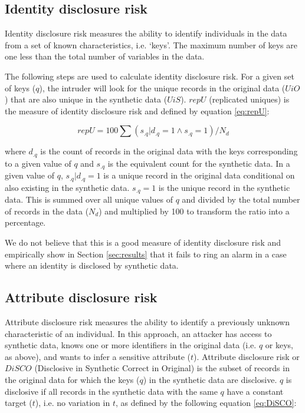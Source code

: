 \documentclass[a4paper,11pt]{style/uneceart}
\begin{document}
\subsection{Identity disclosure risk} 
Identity disclosure risk measures the ability to identify individuals in the data from a set of known characteristics, i.e. `keys'. The maximum number of keys are one less than the total number of variables in the data.  

The following steps are used to calculate identity disclosure risk.  For a given set of keys ($q$), the intruder will look for the unique records in the original data ($UiO$) that are also unique in the synthetic data ($UiS$).  $repU$ (replicated uniques) is the measure of identity disclosure risk and defined by equation \ref{eq:repU}:

\begin{equation}
repU = 100 \sum (s_{.q}|d_{.q} = 1 \land s_{.q} = 1 )/N_{d}
\label{eq:repU}
\end{equation}

where $d_{.q}$ is the count of records in the original data with the keys corresponding to a given value of $q$ and $s_{.q}$ is the equivalent count for the synthetic data.  In a given value of $q$, $s_{.q}|d_{.q} = 1$ is a unique record in the original data conditional on also existing in the synthetic data.  $s_{.q} = 1$ is the unique record in the synthetic data.  This is summed over all unique values of $q$ and divided by the total number of records in the data ($N_{d}$) and multiplied by 100 to transform the ratio into a percentage.

We do not believe that this is a good measure of identity disclosure risk and empirically show in Section \ref{sec:results} that it fails to ring an alarm in a case where an identity is disclosed by synthetic data.

\subsection{Attribute disclosure risk} 
Attribute disclosure risk measures the ability to identify a previously unknown characteristic of an individual.  In this approach, an attacker has access to synthetic data, knows one or more identifiers in the original data (i.e. $q$ or keys, as above), and wants to infer a sensitive attribute ($t$).  Attribute disclosure risk or $DiSCO$ (Disclosive in Synthetic Correct in Original) is the subset of records in the original data for which the keys ($q$) in the synthetic data are disclosive. $q$ is disclosive if all records in the synthetic data with the same $q$ have a constant target ($t$), i.e. no variation in $t$, as defined by the following equation \ref{eq:DiSCO}:
\end{document}
